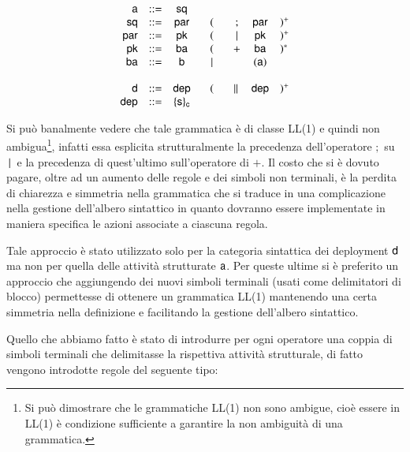 $$
\begin{array}{rcccccl}
{\sf a} 	& ::= & {\sf sq}	& 	&&&\\
{\sf sq} 	& ::= & {\sf par} & (&  ; 	& {\sf par} & )^+ \\
{\sf par} & ::= & {\sf pk} 	& (& \,|\, & {\sf pk}  & )^+ \\
{\sf pk} 	& ::= & {\sf ba}  & (& + 	& {\sf ba}  & )^* \\
{\sf ba}  & ::= & {\sf b} 	& \!\quad | \quad\! & &( {\sf a} ) \\
\\ 
{\sf d} 	& ::= & {\sf dep} & (& \|\, & {\sf dep}  & )^+ \\
{\sf dep} & ::= & \{ {\sf s} \}_{{\sf c}} 	& & & \\
\end{array}
$$ 

Si può banalmente vedere che tale grammatica è di classe LL(1) e quindi non
ambigua\footnote{Si può dimostrare che le grammatiche LL(1) non sono ambigue,
cioè essere in LL(1) è condizione sufficiente a garantire la non ambiguità di
una grammatica.}, infatti essa esplicita strutturalmente la precedenza
dell'operatore $;$ su $\,|\,$ e la precedenza di quest'ultimo sull'operatore di
$+$. Il costo che si è dovuto pagare, oltre ad un aumento delle regole e dei
simboli non terminali, è la perdita di chiarezza e simmetria nella
grammatica che si traduce in una complicazione nella gestione
dell'albero sintattico in quanto dovranno essere implementate in maniera
specifica le azioni associate a ciascuna regola.

Tale approccio è stato utilizzato solo per la categoria sintattica dei
deployment ${\sf d}$ ma non per quella delle attività strutturate ${\sf a}$. Per
queste ultime si è preferito un approccio che aggiungendo dei nuovi simboli
terminali (usati come delimitatori di blocco) permettesse di ottenere un
grammatica LL(1) mantenendo una certa simmetria nella definizione e facilitando
la gestione dell'albero sintattico.

Quello che abbiamo fatto è stato di introdurre per ogni operatore una coppia di
simboli terminali che delimitasse la rispettiva attività
strutturale, di fatto vengono introdotte regole del seguente tipo:

